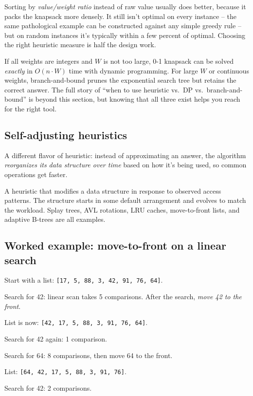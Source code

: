 \documentclass[11pt]{article}
\begin{document}
\begin{ideabox}
Sorting by \emph{value/weight ratio} instead of raw value usually
does better, because it packs the knapsack more densely. It still
isn't optimal on every instance -- the same pathological example
can be constructed against any simple greedy rule -- but on random
instances it's typically within a few percent of optimal. Choosing
the right heuristic measure is half the design work.
\end{ideabox}

\begin{notebox}
If all weights are integers and $W$ is not too large, 0-1 knapsack
can be solved \emph{exactly} in $O(n \cdot W)$ time with dynamic
programming. For large $W$ or continuous weights, branch-and-bound
prunes the exponential search tree but retains the correct answer.
The full story of ``when to use heuristic vs.\ DP vs.\
branch-and-bound'' is beyond this section, but knowing that all
three exist helps you reach for the right tool.
\end{notebox}

\subsection{Self-adjusting heuristics}

A different flavor of heuristic: instead of approximating an answer,
the algorithm \emph{reorganizes its data structure over time} based
on how it's being used, so common operations get faster.

\begin{defnbox}
A heuristic that modifies a data structure in response to observed
access patterns. The structure starts in some default arrangement and
evolves to match the workload. Splay trees, AVL rotations, LRU caches,
move-to-front lists, and adaptive B-trees are all examples.
\end{defnbox}

\subsection{Worked example: move-to-front on a linear search}

\begin{examplebox}
Start with a list: \texttt{[17, 5, 88, 3, 42, 91, 76, 64]}.

Search for 42: linear scan takes 5 comparisons. After the search,
\emph{move 42 to the front}.

List is now: \texttt{[42, 17, 5, 88, 3, 91, 76, 64]}.

Search for 42 again: 1 comparison.

Search for 64: 8 comparisons, then move 64 to the front.

List: \texttt{[64, 42, 17, 5, 88, 3, 91, 76]}.

Search for 42: 2 comparisons.
\end{examplebox}
\end{document}
